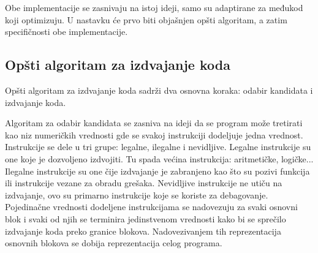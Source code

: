 \documentclass[12pt,oneside]{memoir}
\begin{document}
Obe implementacije se zasnivaju na istoj ideji, samo su adaptirane za međukod koji optimizuju.
U nastavku će prvo biti objašnjen opšti algoritam, a zatim specifičnosti obe implementacije.

\subsection{Opšti algoritam za izdvajanje koda}

Opšti algoritam za izdvajanje koda sadrži dva osnovna koraka: odabir kandidata i izdvajanje koda.

Algoritam za odabir kandidata se zasniva na ideji da se program može tretirati kao niz numeričkih vrednosti
gde se svakoj instrukciji dodeljuje jedna vrednost.
Instrukcije se dele u tri grupe: legalne, ilegalne i nevidljive.
Legalne instrukcije su one koje je dozvoljeno izdvojiti. Tu spada većina instrukcija: aritmetičke, logičke...
Ilegalne instrukcije su one čije izdvajanje je zabranjeno kao što su pozivi funkcija ili instrukcije vezane za obradu grešaka.
Nevidljive instrukcije ne utiču na izdvajanje, ovo su primarno instrukcije koje se koriste za debagovanje.
Pojedinačne vrednosti dodeljene instrukcijama se nadovezuju za svaki osnovni blok i svaki od njih se terminira jedinstvenom vrednosti kako bi se sprečilo izdvajanje koda preko granice blokova.
Nadovezivanjem tih reprezentacija osnovnih blokova se dobija reprezentacija celog programa.

\end{document}

